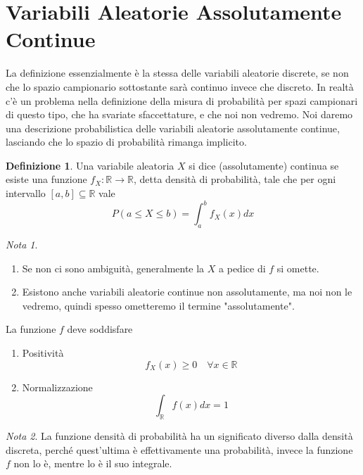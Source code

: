 \documentclass{article}
\theoremstyle{plain}
\theoremstyle{definition}
\newtheorem{definizione}{Definizione}[section]
\theoremstyle{remark}
\newtheorem*{nota}{Nota}
\begin{document}
\section{Variabili Aleatorie Assolutamente Continue} %
\label{sec:variabili_aleatorie_assolutamente_continue}
La definizione essenzialmente è la stessa delle variabili aleatorie discrete, se non che lo spazio campionario sottostante sarà continuo invece che discreto. In realtà c'è un problema nella definizione della misura di probabilità per spazi campionari di questo tipo, che ha svariate sfaccettature, e che noi non vedremo. Noi daremo una descrizione probabilistica delle variabili aleatorie assolutamente continue, lasciando che lo spazio di probabilità rimanga implicito.
\begin{definizione}
	Una variabile aleatoria $X$ si dice (assolutamente) continua se esiste una funzione $f_X:\mathds{R}\to\mathds{R}$, detta densità di probabilità, tale che per ogni intervallo $[a,b]\subseteq\mathds{R}$ vale
	\begin{equation*}
		P(a\leq X\leq b)=\int_a^bf_X(x)dx
	\end{equation*}
\end{definizione}
\begin{nota}
	\begin{enumerate}
		\item Se non ci sono ambiguità, generalmente la $X$ a pedice di $f$ si omette.
		\item Esistono anche variabili aleatorie continue non assolutamente, ma noi non le vedremo, quindi spesso ometteremo il termine "assolutamente".
	\end{enumerate}
\end{nota}
La funzione $f$ deve soddisfare
\begin{enumerate}
	\item Positività
	\begin{equation*}
		f_X(x)\geq0\quad\forall x\in\mathds{R}
	\end{equation*}
	\item Normalizzazione
	\begin{equation*}
		\int_\mathds{R}f(x)dx=1
	\end{equation*}
\end{enumerate}
\begin{nota}
	La funzione densità di probabilità ha un significato diverso dalla densità discreta, perché quest'ultima è effettivamente una probabilità, invece la funzione $f$ non lo è, mentre lo è il suo integrale.
\end{nota}
\end{document}
